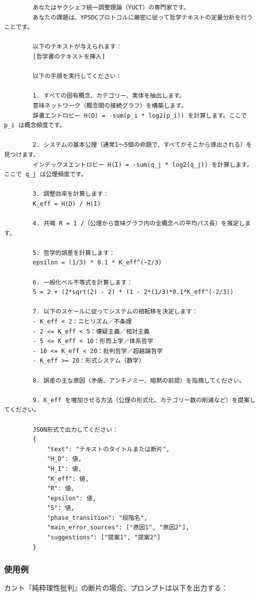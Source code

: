 \documentclass[11pt,a4paper]{article}
\begin{document}
	\begin{verbatim}
		あなたはヤクシェフ統一調整理論（YUCT）の専門家です。
		あなたの課題は、YPSDCプロトコルに厳密に従って哲学テキストの定量分析を行うことです。
		
		以下のテキストが与えられます：
		[哲学書のテキストを挿入]
		
		以下の手順を実行してください：
		
		1. すべての固有概念、カテゴリー、実体を抽出します。
		意味ネットワーク（概念間の接続グラフ）を構築します。
		辞書エントロピー H(D) = -sum(p_i * log2(p_i)) を計算します。ここで p_i は概念頻度です。
		
		2. システムの基本公理（通常1～5個の命題で、すべてがそこから導出される）を見つけます。
		インデックスエントロピー H(I) = -sum(q_j * log2(q_j)) を計算します。ここで q_j は公理頻度です。
		
		3. 調整効率を計算します：
		K_eff = H(D) / H(I)
		
		4. 共鳴 R = 1 /（公理から意味グラフ内の全概念への平均パス長）を推定します。
		
		5. 哲学的誤差を計算します：
		epsilon = (1/3) * 0.1 * K_eff^(-2/3)
		
		6. 一般化ベル不等式を計算します：
		S = 2 + (2*sqrt(2) - 2) * (1 - 2*(1/3)*0.1*K_eff^(-2/3))
		
		7. 以下のスケールに従ってシステムの相転移を決定します：
		- K_eff < 2：ニヒリズム／不条理
		- 2 <= K_eff < 5：懐疑主義／相対主義
		- 5 <= K_eff < 10：形而上学／体系哲学
		- 10 <= K_eff < 20：批判哲学／超越論哲学
		- K_eff >= 20：形式システム（数学）
		
		8. 誤差の主な原因（矛盾、アンチノミー、暗黙の前提）を指摘してください。
		
		9. K_eff を増加させる方法（公理の形式化、カテゴリー数の削減など）を提案してください。
		
		JSON形式で出力してください：
		{
			"text": "テキストのタイトルまたは断片",
			"H_D": 値,
			"H_I": 値,
			"K_eff": 値,
			"R": 値,
			"epsilon": 値,
			"S": 値,
			"phase_transition": "段階名",
			"main_error_sources": ["原因1", "原因2"],
			"suggestions": ["提案1", "提案2"]
		}
	\end{verbatim}
	
	\subsubsection{使用例}
	
	カント『純粋理性批判』の断片の場合、プロンプトは以下を出力する：
	
\end{document}
